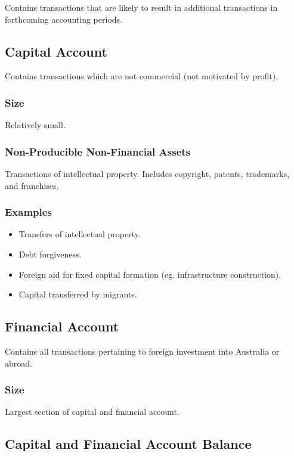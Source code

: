 \documentclass[a4paper,11pt]{report}
\begin{document}
Contains transactions that are likely to result in additional transactions in
forthcoming accounting periods.

\subsection{Capital Account}

Contains transactions which are not commercial (not motivated by profit).

\subsubsection{Size}

Relatively small.

\subsubsection{Non-Producible Non-Financial Assets}

Transactions of intellectual property. Includes copyright, patents, trademarks,
and franchises.

\subsubsection{Examples}

\begin{itemize}
\item Transfers of intellectual property.
\item Debt forgiveness.
\item Foreign aid for fixed capital formation (eg. infrastructure construction).
\item Capital transferred by migrants.
\end{itemize}

\subsection{Financial Account}

Contains all transactions pertaining to foreign investment into Australia or
abroad.

\subsubsection{Size}

Largest section of capital and financial account.

\subsection{Capital and Financial Account Balance}
\end{document}
